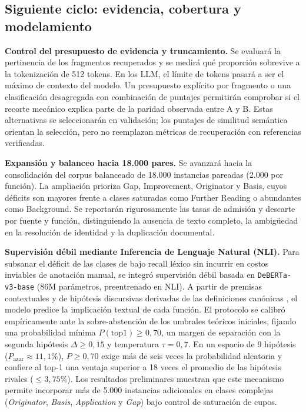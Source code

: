 \documentclass[10pt,a4paper,twocolumn]{article}
\begin{document}
\subsection{Siguiente ciclo: evidencia, cobertura y modelamiento}
\textbf{Control del presupuesto de evidencia y truncamiento.} Se evaluará la pertinencia de los fragmentos recuperados y se medirá qué proporción sobrevive a la tokenización de 512 tokens. En los LLM, el límite de tokens pasará a ser el máximo de contexto del modelo. Un presupuesto explícito por fragmento o una clasificación desagregada con combinación de puntajes permitirán comprobar si el recorte mecánico explica parte de la paridad observada entre A y B. Estas alternativas se seleccionarán en validación; los puntajes de similitud semántica orientan la selección, pero no reemplazan métricas de recuperación con referencias verificadas.

\textbf{Expansión y balanceo hacia 18.000 pares.} Se avanzará hacia la consolidación del corpus balanceado de 18.000 instancias pareadas (2.000 por función). La ampliación prioriza Gap, Improvement, Originator y Basis, cuyos déficits son mayores frente a clases saturadas como Further Reading o abundantes como Background. Se reportarán rigurosamente las tasas de admisión y descarte por fuente y función, distinguiendo la ausencia de texto completo, la ambigüedad en la resolución de identidad y la duplicación documental.

\textbf{Supervisión débil mediante Inferencia de Lenguaje Natural (NLI).} Para subsanar el déficit de las clases de bajo recall léxico sin incurrir en costos inviables de anotación manual, se integró supervisión débil basada en \texttt{DeBERTa-v3-base} (86M parámetros, preentrenado en NLI). A partir de premisas contextuales y de hipótesis discursivas derivadas de las definiciones canónicas \cite{Lyu2021}, el modelo predice la implicación textual de cada función. El protocolo se calibró empíricamente ante la sobre-abstención de los umbrales teóricos iniciales, fijando una probabilidad mínima $P(\text{top1}) \ge 0{,}70$, un margen de separación con la segunda hipótesis $\Delta \ge 0{,}15$ y temperatura $\tau = 0{,}7$. En un espacio de 9 hipótesis ($P_{\text{azar}} \approx 11{,}1\%$), $P \ge 0{,}70$ exige más de seis veces la probabilidad aleatoria y confiere al top-1 una ventaja superior a 18 veces el promedio de las hipótesis rivales ($\le 3{,}75\%$). Los resultados preliminares muestran que este mecanismo permite incorporar más de 5.000 instancias adicionales en clases complejas (\textit{Originator}, \textit{Basis}, \textit{Application} y \textit{Gap}) bajo control de saturación de cupos.
\end{document}
